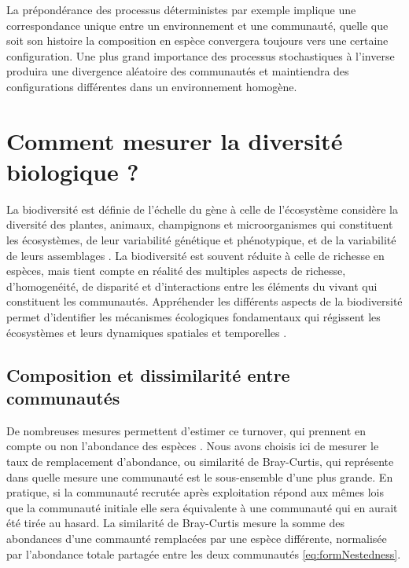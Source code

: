 \documentclass[
  11pt,
  french,
  A4paper,
  extrafontsizes,onecolumn,openright
  ]{memoir}
\begin{document}
La prépondérance des processus déterministes par exemple implique une
correspondance unique entre un environnement et une communauté, quelle
que soit son histoire la composition en espèce convergera toujours vers
une certaine configuration. Une plus grand importance des processus
stochastiques à l'inverse produira une divergence aléatoire des
communautés et maintiendra des configurations différentes dans un
environnement homogène.

\section{Comment mesurer la diversité biologique
?}\label{comment-mesurer-la-diversite-biologique}

La biodiversité est définie de l'échelle du gène à celle de l'écosystème
considère la diversité des plantes, animaux, champignons et
microorganismes qui constituent les écosystèmes, de leur variabilité
génétique et phénotypique, et de la variabilité de leurs assemblages
\autocite{Loreau2005}. La biodiversité est souvent réduite à celle de
richesse en espèces, mais tient compte en réalité des multiples aspects
de richesse, d'homogenéité, de disparité et d'interactions entre les
éléments du vivant qui constituent les communautés. Appréhender les
différents aspects de la biodiversité permet d'identifier les mécanismes
écologiques fondamentaux qui régissent les écosystèmes et leurs
dynamiques spatiales et temporelles \autocites{Purvis2000}{Loreau2005}.

\subsection{Composition et dissimilarité entre
communautés}\label{composition-et-dissimilarite-entre-communautes}

De nombreuses mesures permettent d'estimer ce turnover, qui prennent en
compte ou non l'abondance des espèces \autocite{Podani2013a}. Nous avons
choisis ici de mesurer le taux de remplacement d'abondance, ou
similarité de Bray-Curtis, qui représente dans quelle mesure une
communauté est le sous-ensemble d'une plus grande. En pratique, si la
communauté recrutée après exploitation répond aux mêmes lois que la
communauté initiale elle sera équivalente à une communauté qui en aurait
été tirée au hasard. La similarité de Bray-Curtis mesure la somme des
abondances d'une commaunté remplacées par une espèce différente,
normalisée par l'abondance totale partagée entre les deux communautés
\eqref{eq:formNestedness}.
\end{document}

